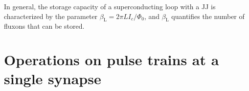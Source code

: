 \documentclass[twocolumn]{article}
\begin{document}
In general, the storage capacity of a superconducting loop with a JJ is characterized by the parameter $\beta_{\mathrm{L}} = 2\pi L I_c/\Phi_0$, and $\beta_{\mathrm{L}}$ quantifies the number of fluxons that can be stored. 

\begin{figure} 
\end{figure}

\section{\label{sec:short_term}Operations on pulse trains at a single synapse}

\begin{figure} 
\end{figure}
\end{document}

